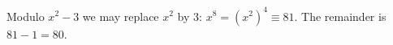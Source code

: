 Modulo $x^2-3$ we may replace $x^2$ by $3$: $x^8=(x^2)^4\equiv81$. The remainder is $81-1=\boxed{80}$.

